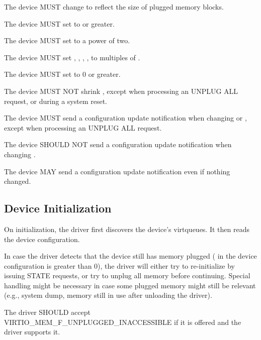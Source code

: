 The device MUST change  to reflect the size of plugged
memory blocks.

The device MUST set  to  or
greater.

The device MUST set  to a power of two.

The device MUST set , ,
, ,  to
multiples of .

The device MUST set  to 0 or greater.

The device MUST NOT shrink , except when
processing an UNPLUG ALL request, or during a system reset.

The device MUST send a configuration update notification when changing
 or , except when
processing an UNPLUG ALL request.

The device SHOULD NOT send a configuration update notification when
changing .

The device MAY send a configuration update notification even if nothing
changed.

\subsection{Device Initialization}\label{Device Types / Memory Device / Device Initialization}

On initialization, the driver first discovers the device's virtqueues.  It
then reads the device configuration.

In case the driver detects that the device still has memory plugged
( in the device configuration is greater than 0), the
driver will either try to re-initialize by issuing STATE requests, or try
to unplug all memory before continuing.  Special handling might be
necessary in case some plugged memory might still be relevant (e.g., system
dump, memory still in use after unloading the driver).


The driver SHOULD accept VIRTIO_MEM_F_UNPLUGGED_INACCESSIBLE if it is
offered and the driver supports it.

